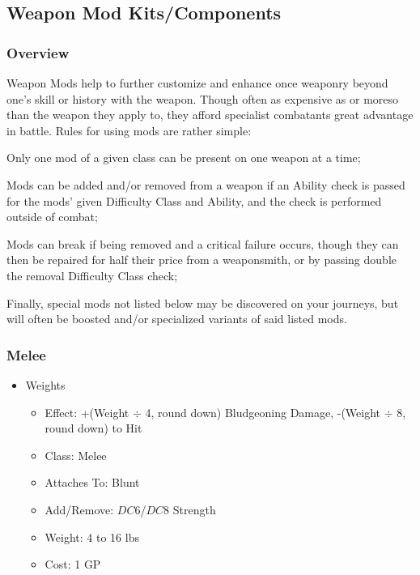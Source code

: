 \documentclass[12pt, twoside]{article}
\begin{document}
\begin{FlushLeft}
\begin{multicols}{2}
			\subsection{Weapon Mod Kits/Components}
			\subsubsection{Overview}
			Weapon Mods help to further customize and enhance once weaponry beyond one's skill or history with the weapon.
			Though often as expensive as or moreso than the weapon they apply to, they afford specialist combatants great advantage in battle. \linebreak
			Rules for using mods are rather simple: \linebreak

			Only one mod of a given class can be present on one weapon at a time; \linebreak

			Mods can be added and/or removed from a weapon if an Ability check is passed for the mods' given Difficulty Class and Ability, and the check is performed outside of combat; \linebreak

			Mods can break if being removed and a critical failure occurs, though they can then be repaired for half their price from a weaponsmith, or by passing double the removal Difficulty Class check; \linebreak

			Finally, special mods not listed below may be discovered on your journeys, but will often be boosted and/or specialized variants of said listed mods.

			\subsubsection{Melee}
			\begin{itemize}[wide]
				\item Weights
				\begin{itemize}
					\item Effect: +(Weight $\div$ 4, round down) Bludgeoning Damage, -(Weight $\div$ 8, round down) to Hit
					\item Class: Melee
					\item Attaches To: Blunt 
					\item Add/Remove: $DC6$/$DC8$ Strength
					\item Weight: 4 to 16 lbs
					\item Cost: 1 GP
				\end{itemize}
			\end{itemize}
			\vfill \null \columnbreak


\end{multicols}
\end{FlushLeft}
\end{document}
